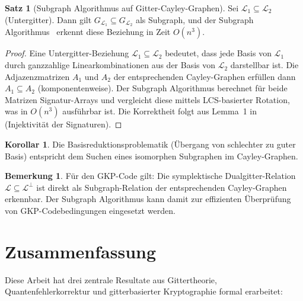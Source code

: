﻿\documentclass[a4paper,12pt]{article}
\theoremstyle{definition}
\newtheorem{satz}{Satz}
\newtheorem{korollar}{Korollar}
\newtheorem{bemerkung}{Bemerkung}
\newcommand{\Lat}{\mathcal{L}}
\begin{document}
\begin{satz}[Subgraph Algorithmus auf Gitter-Cayley-Graphen]
\label{satz:subgraph_gitter}
Sei $\Lat_1 \subseteq \Lat_2$ (Untergitter). Dann gilt $G_{\Lat_1} \subseteq G_{\Lat_2}$
als Subgraph, und der Subgraph Algorithmus~\cite{Epp2026Subgraph} erkennt diese
Beziehung in Zeit $O(n^3)$.
\end{satz}

\begin{proof}
Eine Untergitter-Beziehung $\Lat_1 \subseteq \Lat_2$ bedeutet, dass jede Basis von $\Lat_1$
durch ganzzahlige Linearkombinationen aus der Basis von $\Lat_2$ darstellbar ist.
Die Adjazenzmatrizen $A_1$ und $A_2$ der entsprechenden Cayley-Graphen erfüllen dann
$A_1 \subseteq A_2$ (komponentenweise).
Der Subgraph Algorithmus berechnet für beide Matrizen Signatur-Arrays und vergleicht diese
mittels LCS-basierter Rotation, was in $O(n^3)$ ausführbar ist.
Die Korrektheit folgt aus Lemma~1 in~\cite{Epp2026Subgraph} (Injektivität der Signaturen).
\end{proof}

\begin{korollar}
Die Basisreduktionsproblematik (Übergang von schlechter zu guter Basis)
entspricht dem Suchen eines isomorphen Subgraphen im Cayley-Graphen.
\end{korollar}

\begin{bemerkung}
Für den GKP-Code gilt: Die symplektische Dualgitter-Relation $\Lat \subseteq \Lat^\perp$
ist direkt als Subgraph-Relation der entsprechenden Cayley-Graphen erkennbar.
Der Subgraph Algorithmus kann damit zur effizienten Überprüfung von GKP-Codebedingungen
eingesetzt werden.
\end{bemerkung}

\section{Zusammenfassung}

Diese Arbeit hat drei zentrale Resultate aus Gittertheorie, Quantenfehlerkorrektur
und gitterbasierter Kryptographie formal erarbeitet:
\end{document}
